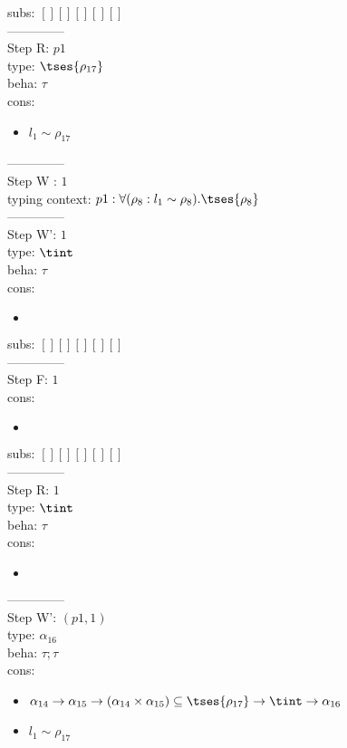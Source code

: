 \documentclass[12pt]{article}
\begin{document}
 subs:  $ [ ] [] [] [] [] $ 
  \\--------------\\ 
Step R: $ p1 $\\
  type: $  \tses{ \rho_{17}} $ 
\\  beha: $ \tau $ 
\\  cons: \begin{itemize}
\item $ l_{1} \sim\rho_{17} $
\end{itemize} 
  --------------\\ 
Step W : $ 1 $\\
 typing context: $ p1:\forall (\rho_{8} : l_{1} \sim\rho_{8}).  \tses{ \rho_{8}}$ 
\\ --------------\\
Step W': $ 1 $\\
  type: $ \tint $ 
\\  beha: $ \tau $ 
\\  cons: \begin{itemize}
\item $  $
\end{itemize} 
  subs:  $ [ ] [] [] [] [] $  
 \\--------------\\ 
Step F: $ 1 $
 \\ cons: \begin{itemize}
\item $  $
\end{itemize}
 subs:  $ [ ] [] [] [] [] $ 
  \\--------------\\ 
Step R: $ 1 $\\
  type: $ \tint $ 
\\  beha: $ \tau $ 
\\  cons: \begin{itemize}
\item $  $
\end{itemize} 
  --------------\\ 
Step W': $ (p1, 1) $\\
  type: $ \alpha_{16} $ 
\\  beha: $ \tau; \tau $ 
\\  cons: \begin{itemize}
\item $ \alpha_{14} \rightarrow \alpha_{15} \rightarrow (\alpha_{14} \times \alpha_{15}) \subseteq  \tses{ \rho_{17}} \rightarrow \tint \rightarrow \alpha_{16} $
\item $ l_{1} \sim\rho_{17} $
\end{itemize} 
\end{document}
